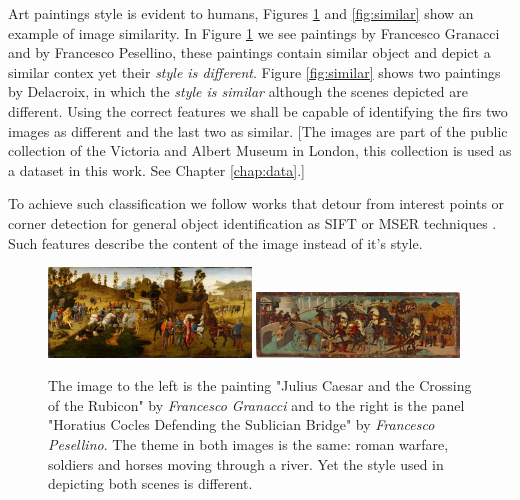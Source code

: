\documentclass[11pt,a4paper,twoside,openright,draft]{report}
\begin{document}
\begin{multicols}{2}
Art paintings style is evident to humans, Figures \ref{fig:diff} and
\ref{fig:similar} show an example of image similarity.  In Figure
\ref{fig:diff} we see paintings by Francesco Granacci and by Francesco
Pesellino, these paintings contain similar object and depict a similar contex
yet their \emph{style is different}.  Figure \ref{fig:similar} shows two
paintings by Delacroix, in which the \emph{style is similar} although the
scenes depicted are different.  Using the correct features we shall be capable
of identifying the firs two images as different and the last two as similar.
[The images are part of the public collection of the Victoria and Albert Museum
in London, this collection is used as a dataset in this work.  See Chapter
\ref{chap:data}.]

To achieve such classification we follow works that detour from interest points
or corner detection for general object identification as SIFT or MSER
techniques \cite{szel11book}.  Such features describe the content of the image
instead of it's style.

\begin{figure}[tb]  %
\centering
\includegraphics[width=0.48\textwidth]{diff_caesar}
\includegraphics[width=0.48\textwidth]{diff_horatius}
\caption[Example of different styles]{The image to the left is the painting
"Julius Caesar and the Crossing of the Rubicon" by \emph{Francesco Granacci}
and to the right is the panel "Horatius Cocles Defending the Sublician Bridge"
by \emph{Francesco Pesellino}.  The theme in both images is the same: roman
warfare, soldiers and horses moving through a river.  Yet the style used in
depicting both scenes is different.}
\label{fig:diff}
\end{figure}


\end{multicols}
\end{document}
